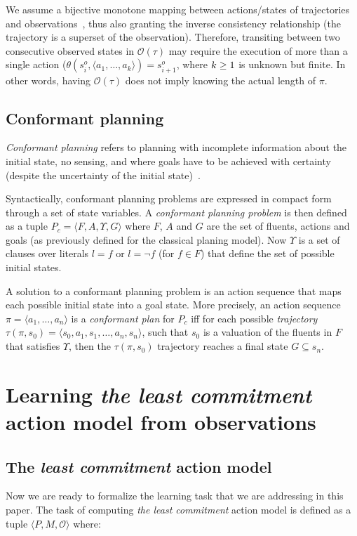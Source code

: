 \documentclass{article}
\newcommand{\tup}[1]{{\langle #1 \rangle}}
\begin{document}
We assume a bijective monotone mapping between actions/states of trajectories and observations~\cite{ramirez2009plan}, thus also granting the inverse consistency relationship (the trajectory is a superset of the observation). Therefore, transiting between two consecutive observed states in $\mathcal{O}(\tau)$ may require the execution of more than a single action ($\theta(s_i^o,\tup{a_1,\ldots,a_k})=s_{i+1}^o$, where ${\small k\geq 1}$ is unknown but finite. In other words, having $\mathcal{O}(\tau)$ does not imply knowing the actual length of $\pi$.

\subsection{Conformant planning}
{\em Conformant planning} refers to planning with incomplete information about the initial state, no sensing, and where goals have to be achieved with certainty (despite the uncertainty of the initial state)~\cite{smith1998conformant,goldman1996expressive}.

Syntactically, conformant planning problems are expressed in compact form through a set of state variables. A {\em conformant planning problem} is then defined as a tuple $P_c=\tup{F,A,\Upsilon,G}$ where $F$, $A$ and $G$ are the set of fluents, actions and goals (as previously defined for the classical planing model). Now $\Upsilon$ is a set of clauses over literals $l=f$ or $l=\neg f$ (for $f\in F$) that define the set of possible initial states. 

A solution to a conformant planning problem is an action sequence that maps each possible initial state into a goal state. More precisely, an action sequence $\pi=\tup{a_1, \ldots, a_n}$ is a {\em conformant plan} for $P_c$ iff for each possible {\em trajectory} $\tau(\pi,s_0)=\tup{s_0, a_1, s_1, \ldots, a_n, s_n}$, such that $s_0$ is a valuation of the fluents in $F$ that satisfies $\Upsilon$, then the $\tau(\pi,s_0)$ trajectory reaches a final state $G \subseteq s_n$.

\section{Learning {\em the least commitment} action model from observations}

\subsection{The {\em least commitment} action model}
Now we are ready to formalize the learning task that we are addressing in this paper. The task of computing {\em the least commitment} action model is defined as a tuple $\tup{P,M,\mathcal{O}}$ where:
\end{document}
